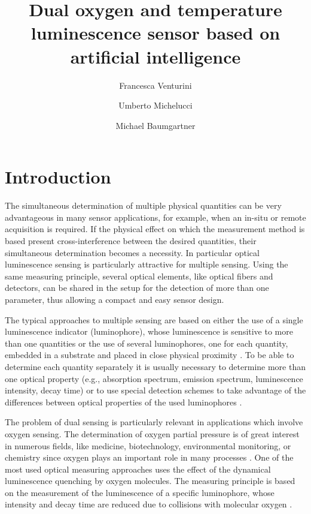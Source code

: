 \documentclass[9pt,twocolumn,twoside,pdftex]{optica}
\title{Dual oxygen and temperature luminescence sensor based on artificial intelligence}
\author[1,2,*]{Francesca Venturini}
\author[2]{Umberto Michelucci}
\author[1]{Michael Baumgartner}
\affil[1]{Institute of Applied Mathematics and Physics, Zurich University of Applied Sciences,
Technikumstrasse 9, 8401 Winterthur, Switzerland}
\affil[2]{TOELT LLC; Birchlenstr. 25, 8600 Dübendorf, Switzerland}
\affil[*]{Corresponding author: francesca.venturini@zhaw.ch}
\begin{document}
\maketitle

\section{Introduction}

The simultaneous determination of multiple physical quantities can be very advantageous in many sensor applications, for example, when an in-situ or remote acquisition is required. 
If the physical effect on which the measurement method is based present cross-interference between the desired quantities, their simultaneous determination becomes a necessity.
%
In particular optical luminescence sensing is particularly attractive for multiple sensing. Using the same measuring principle, several optical elements, like optical fibers and detectors, can be shared in the setup for the detection of more than one parameter, thus allowing a compact and easy sensor design.

The typical approaches to multiple sensing are based on either the use of a single luminescence indicator (luminophore), whose luminescence is sensitive to more than one quantities or the use of several luminophores, one for each quantity, embedded in a substrate and placed in close physical proximity \cite{Stich2010,Borisov2011novel,Kameya2014,Wang2014,Santoro2016,Biring2019}. To be able to determine each quantity separately it is usually necessary to determine more than one optical property (e.g., absorption spectrum, emission spectrum, luminescence intensity, decay time) or to use special detection schemes to take advantage of the differences between optical properties of the used luminophores \cite{Collier2013,Wang2014,Stehning2004,Jorge2008,Biring2019,Moore2006}. 

The problem of dual sensing is particularly relevant in applications which involve oxygen sensing. The determination of oxygen partial pressure is of great interest in numerous fields, like medicine, biotechnology, environmental monitoring, or chemistry since oxygen plays an important role in many processes \cite{Papkovsky2013,Wang2014}. One of the most used optical measuring approaches uses the effect of the dynamical luminescence quenching by oxygen molecules. The measuring principle is based on the measurement of the luminescence of a specific luminophore, whose intensity and decay time are reduced due to collisions with molecular oxygen \cite{Lakowicz2006}.
\end{document}
